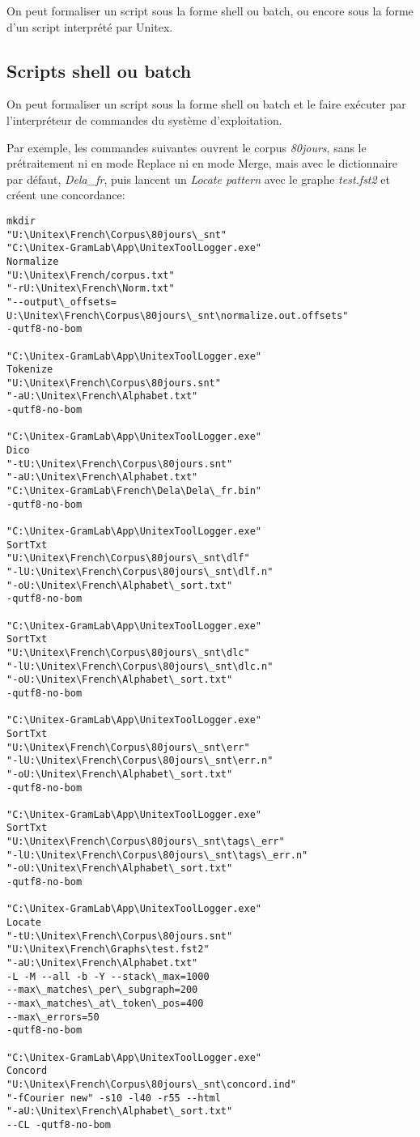 \bigskip
\noindent On peut formaliser un script sous la forme shell ou batch, ou encore sous la forme d'un script interprété par Unitex.

\subsection{Scripts shell ou batch}
\label{section-batch}

On peut formaliser un script sous la forme shell ou batch et le faire exécuter par l'interpréteur de commandes du système d'exploitation.

\bigskip
\noindent Par exemple, les commandes suivantes ouvrent le corpus \textit{80jours}, sans le prétraitement ni en mode Replace ni en mode Merge, mais avec le dictionnaire par défaut, \textit{Dela\_fr}, puis lancent un \textit{Locate pattern} avec le graphe \textit{test.fst2} et créent une concordance:

\begin{verbatim}
mkdir 
"U:\Unitex\French\Corpus\80jours\_snt" 
"C:\Unitex-GramLab\App\UnitexToolLogger.exe" 
Normalize 
"U:\Unitex\French/corpus.txt" 
"-rU:\Unitex\French\Norm.txt" 
"--output\_offsets=
U:\Unitex\French\Corpus\80jours\_snt\normalize.out.offsets" 
-qutf8-no-bom

"C:\Unitex-GramLab\App\UnitexToolLogger.exe" 
Tokenize 
"U:\Unitex\French\Corpus\80jours.snt" 
"-aU:\Unitex\French\Alphabet.txt" 
-qutf8-no-bom

"C:\Unitex-GramLab\App\UnitexToolLogger.exe" 
Dico 
"-tU:\Unitex\French\Corpus\80jours.snt" 
"-aU:\Unitex\French\Alphabet.txt" 
"C:\Unitex-GramLab\French\Dela\Dela\_fr.bin" 
-qutf8-no-bom

"C:\Unitex-GramLab\App\UnitexToolLogger.exe" 
SortTxt 
"U:\Unitex\French\Corpus\80jours\_snt\dlf" 
"-lU:\Unitex\French\Corpus\80jours\_snt\dlf.n" 
"-oU:\Unitex\French\Alphabet\_sort.txt" 
-qutf8-no-bom

"C:\Unitex-GramLab\App\UnitexToolLogger.exe" 
SortTxt 
"U:\Unitex\French\Corpus\80jours\_snt\dlc" 
"-lU:\Unitex\French\Corpus\80jours\_snt\dlc.n" 
"-oU:\Unitex\French\Alphabet\_sort.txt" 
-qutf8-no-bom

"C:\Unitex-GramLab\App\UnitexToolLogger.exe" 
SortTxt 
"U:\Unitex\French\Corpus\80jours\_snt\err" 
"-lU:\Unitex\French\Corpus\80jours\_snt\err.n" 
"-oU:\Unitex\French\Alphabet\_sort.txt" 
-qutf8-no-bom

"C:\Unitex-GramLab\App\UnitexToolLogger.exe" 
SortTxt 
"U:\Unitex\French\Corpus\80jours\_snt\tags\_err" 
"-lU:\Unitex\French\Corpus\80jours\_snt\tags\_err.n" 
"-oU:\Unitex\French\Alphabet\_sort.txt" 
-qutf8-no-bom

"C:\Unitex-GramLab\App\UnitexToolLogger.exe" 
Locate 
"-tU:\Unitex\French\Corpus\80jours.snt" 
"U:\Unitex\French\Graphs\test.fst2" 
"-aU:\Unitex\French\Alphabet.txt" 
-L -M --all -b -Y --stack\_max=1000 
--max\_matches\_per\_subgraph=200 
--max\_matches\_at\_token\_pos=400 
--max\_errors=50 
-qutf8-no-bom

"C:\Unitex-GramLab\App\UnitexToolLogger.exe" 
Concord 
"U:\Unitex\French\Corpus\80jours\_snt\concord.ind" 
"-fCourier new" -s10 -l40 -r55 --html 
"-aU:\Unitex\French\Alphabet\_sort.txt" 
--CL -qutf8-no-bom
\end{verbatim}


